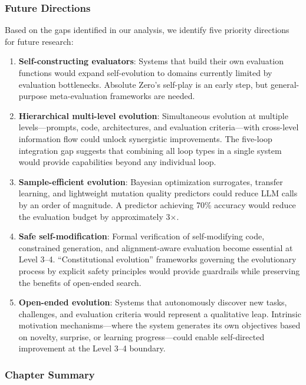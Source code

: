 \subsubsection{Future Directions}

Based on the gaps identified in our analysis, we identify five priority directions for future research:

\begin{enumerate}
    \item \textbf{Self-constructing evaluators}: Systems that build their own evaluation functions would expand self-evolution to domains currently limited by evaluation bottlenecks. Absolute Zero's self-play is an early step, but general-purpose meta-evaluation frameworks are needed.

    \item \textbf{Hierarchical multi-level evolution}: Simultaneous evolution at multiple levels---prompts, code, architectures, and evaluation criteria---with cross-level information flow could unlock synergistic improvements. The five-loop integration gap suggests that combining all loop types in a single system would provide capabilities beyond any individual loop.

    \item \textbf{Sample-efficient evolution}: Bayesian optimization surrogates, transfer learning, and lightweight mutation quality predictors could reduce LLM calls by an order of magnitude. A predictor achieving 70\% accuracy would reduce the evaluation budget by approximately 3$\times$.

    \item \textbf{Safe self-modification}: Formal verification of self-modifying code, constrained generation, and alignment-aware evaluation become essential at Level 3--4. ``Constitutional evolution'' frameworks governing the evolutionary process by explicit safety principles would provide guardrails while preserving the benefits of open-ended search.

    \item \textbf{Open-ended evolution}: Systems that autonomously discover new tasks, challenges, and evaluation criteria would represent a qualitative leap. Intrinsic motivation mechanisms---where the system generates its own objectives based on novelty, surprise, or learning progress---could enable self-directed improvement at the Level 3--4 boundary.
\end{enumerate}


\subsubsection{Chapter Summary}


